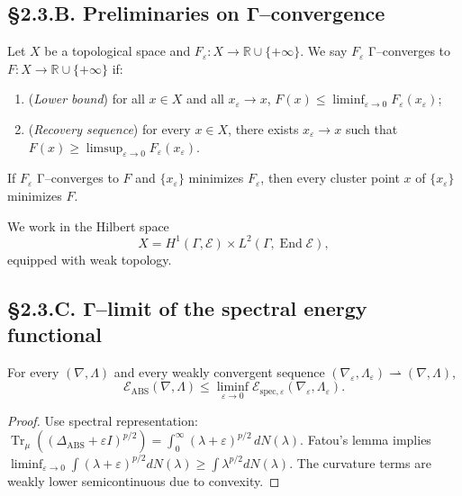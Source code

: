 \subsection*{§2.3.B. Preliminaries on Γ–convergence}

\begin{definition}[Γ–convergence]
Let $X$ be a topological space and $F_\varepsilon:X\to\mathbb{R}\cup\{+\infty\}$.  
We say $F_\varepsilon$ Γ–converges to $F:X\to\mathbb{R}\cup\{+\infty\}$ if:
\begin{enumerate}
\item (\emph{Lower bound}) for all $x\in X$ and all $x_\varepsilon\to x$,  
$\displaystyle F(x)\le\liminf_{\varepsilon\to0}F_\varepsilon(x_\varepsilon)$;
\item (\emph{Recovery sequence}) for every $x\in X$,  
there exists $x_\varepsilon\to x$ such that  
$\displaystyle F(x)\ge\limsup_{\varepsilon\to0}F_\varepsilon(x_\varepsilon)$.
\end{enumerate}
\end{definition}

\begin{theorem}
If $F_\varepsilon$ Γ–converges to $F$ and $\{x_\varepsilon\}$ minimizes $F_\varepsilon$, then every cluster point $x$ of $\{x_\varepsilon\}$ minimizes $F$.
\end{theorem}

We work in the Hilbert space
\[
X = H^1(\Gamma,\mathcal E)\times L^2(\Gamma,\operatorname{End}\mathcal E),
\]
equipped with weak topology.

\subsection*{§2.3.C. Γ–limit of the spectral energy functional}

\begin{lemma}\label{lem:2.3.lower}
For every $(\nabla,\Lambda)$ and every weakly convergent sequence $(\nabla_\varepsilon,\Lambda_\varepsilon)\rightharpoonup(\nabla,\Lambda)$,
\[
\mathcal{E}_{\mathrm{ABS}}(\nabla,\Lambda)
\le \liminf_{\varepsilon\to0}\mathcal{E}_{\mathrm{spec},\varepsilon}(\nabla_\varepsilon,\Lambda_\varepsilon).
\]
\end{lemma}

\begin{proof}
Use spectral representation: $\operatorname{Tr}_\mu((\Delta_{\mathrm{ABS}}+\varepsilon I)^{p/2})=\int_0^\infty (\lambda+\varepsilon)^{p/2}\,dN(\lambda)$.  
Fatou’s lemma implies $\liminf_{\varepsilon\to0}\int(\lambda+\varepsilon)^{p/2}dN(\lambda)\ge\int\lambda^{p/2}dN(\lambda)$.  
The curvature terms are weakly lower semicontinuous due to convexity.
\end{proof}

